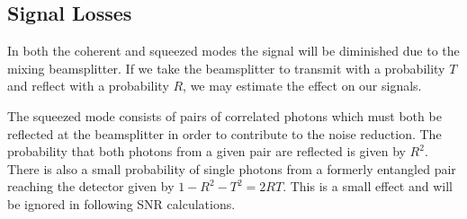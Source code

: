 %
%
%
\subsection{Signal Losses}
In both the coherent and squeezed modes the signal will be diminished due to the mixing beamsplitter.  If we take the beamsplitter to transmit with a probability $T$ and reflect with a probability $R$, we may estimate the effect on our signals.  

The squeezed mode consists of pairs of correlated photons which must both be reflected at the beamsplitter in order to contribute to the noise reduction.  The probability that both photons from a given pair are reflected is given by $R^2$.  There is also a small probability of single photons from a formerly entangled pair reaching the detector given by $1 - R^2 - T^2 = 2RT$.  This is a small effect and will be ignored in following SNR calculations.


